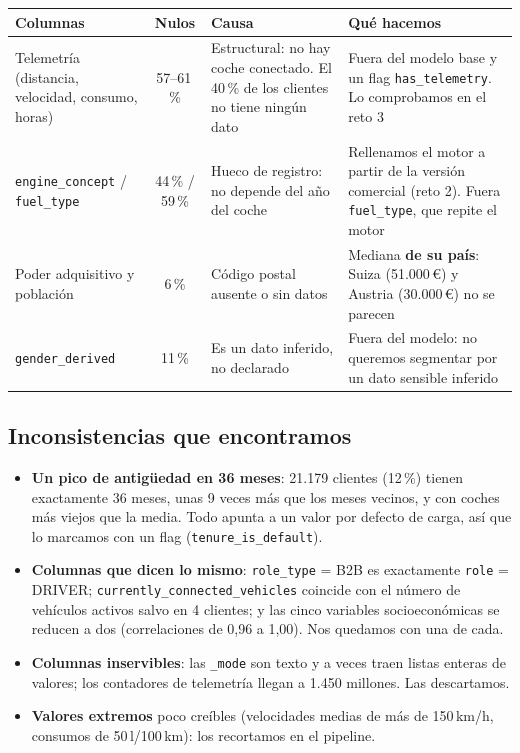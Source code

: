 \documentclass[11pt,a4paper]{article}
\newcommand{\var}[1]{\texttt{\small #1}}
\begin{document}
\begin{table}[H]
\centering\small
\begin{tabularx}{\linewidth}{>{\raggedright\arraybackslash}p{3.6cm}cLL}
\toprule
Columnas & Nulos & Causa & Qué hacemos \\
\midrule
Telemetría (distancia, velocidad, consumo, horas) & 57--61\,\% & Estructural: no hay coche conectado. El 40\,\% de los clientes no tiene ningún dato & Fuera del modelo base y un flag \var{has\_telemetry}. Lo comprobamos en el reto 3 \\
\var{engine\_concept} / \var{fuel\_type} & 44\,\% / 59\,\% & Hueco de registro: no depende del año del coche & Rellenamos el motor a partir de la versión comercial (reto 2). Fuera \var{fuel\_type}, que repite el motor \\
Poder adquisitivo y población & 6\,\% & Código postal ausente o sin datos & Mediana \textbf{de su país}: Suiza (51.000\,€) y Austria (30.000\,€) no se parecen \\
\var{gender\_derived} & 11\,\% & Es un dato inferido, no declarado & Fuera del modelo: no queremos segmentar por un dato sensible inferido \\
\bottomrule
\end{tabularx}
\end{table}

\subsection*{Inconsistencias que encontramos}

\begin{itemize}
  \item \textbf{Un pico de antigüedad en 36 meses}: 21.179 clientes (12\,\%) tienen exactamente 36 meses, unas 9 veces más que los meses vecinos, y con coches más viejos que la media. Todo apunta a un valor por defecto de carga, así que lo marcamos con un flag (\var{tenure\_is\_default}).
  \item \textbf{Columnas que dicen lo mismo}: \var{role\_type} = B2B es exactamente \var{role} = DRIVER; \var{currently\_connected\_vehicles} coincide con el número de vehículos activos salvo en 4 clientes; y las cinco variables socioeconómicas se reducen a dos (correlaciones de 0,96 a 1,00). Nos quedamos con una de cada.
  \item \textbf{Columnas inservibles}: las \var{*\_mode} son texto y a veces traen listas enteras de valores; los contadores de telemetría llegan a 1.450 millones. Las descartamos.
  \item \textbf{Valores extremos} poco creíbles (velocidades medias de más de 150\,km/h, consumos de 50\,l/100\,km): los recortamos en el pipeline.
\end{itemize}
\end{document}
